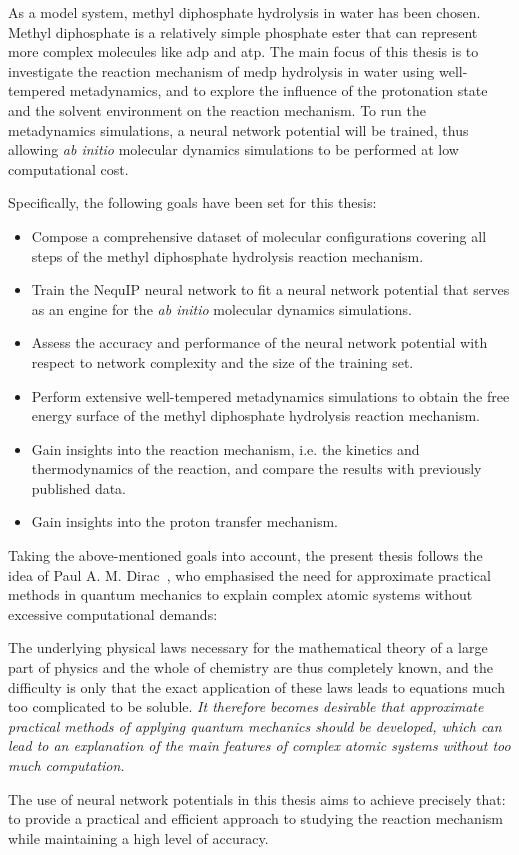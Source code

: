 As a model system, methyl diphosphate hydrolysis in water has been chosen. Methyl diphosphate is a relatively simple phosphate ester that can represent more complex molecules like \ac{adp} and \ac{atp}. The main focus of this thesis is to investigate the reaction mechanism of \ac{medp} hydrolysis in water using well-tempered metadynamics, and to explore the influence of the protonation state and the solvent environment on the reaction mechanism. To run the metadynamics simulations, a neural network potential will be trained, thus allowing \textit{ab initio} molecular dynamics simulations to be performed at low computational cost.

Specifically, the following goals have been set for this thesis:
\begin{itemize}
    \item Compose a comprehensive dataset of molecular configurations covering all steps of the methyl diphosphate hydrolysis reaction mechanism.
    \item Train the NequIP neural network to fit a neural network potential that serves as an engine for the \textit{ab initio} molecular dynamics simulations.
    \item Assess the accuracy and performance of the neural network potential with respect to network complexity and the size of the training set.
    \item Perform extensive well-tempered metadynamics simulations to obtain the free energy surface of the methyl diphosphate hydrolysis reaction mechanism.
    \item Gain insights into the reaction mechanism, i.e. the kinetics and thermodynamics of the reaction, and compare the results with previously published data.
    \item Gain insights into the proton transfer mechanism.
\end{itemize}

Taking the above-mentioned goals into account, the present thesis follows the idea of Paul A. M. Dirac~\citep{diracQuantumMechanicsManyelectron1997}, who emphasised the need for approximate practical methods in quantum mechanics to explain complex atomic systems without excessive computational demands: 

\begin{displayquote}
    The underlying physical laws necessary for the mathematical theory of a large part of physics and the whole of chemistry are thus completely known, and the difficulty is only that the exact application of these laws leads to equations much too complicated to be soluble. \textit{It therefore becomes desirable that approximate practical methods of applying quantum mechanics should be developed, which can lead to an explanation of the main features of complex atomic systems without too much computation.}
\end{displayquote}

The use of neural network potentials in this thesis aims to achieve precisely that: to provide a practical and efficient approach to studying the reaction mechanism while maintaining a high level of accuracy.
